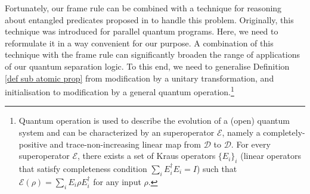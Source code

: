 \documentclass[conference,compsoc, 10pt]{IEEEtran}
\newcommand{\jh}[1]{\textit{\color{red}[JH] : #1}}
\newcommand {\cD } {{\mathcal{D}}}
\newcommand {\cE } {{\mathcal{E}}}
\begin{document}
	Fortunately, our frame rule  can be combined with a technique for reasoning about entangled predicates proposed in \cite{YZL18} to handle this problem. Originally, this technique was introduced for parallel quantum programs. Here, we need to reformulate it in a way convenient for our purpose. 
	A combination of this technique with the frame rule can significantly broaden the range of applications of our quantum separation logic. 
	To this end, we need to generalise Definition \ref{def sub atomic prop} from
  modification by a unitary transformation, and initialisation to modification
  by a general quantum operation.\footnote{Quantum operation is used to describe
    the evolution of a (open) quantum system and can be characterized by an
    superoperator $\cE$, namely a completely-positive and trace-non-increasing
    linear map from $\cD$ to $\cD$.  For every superoperator $\cE$, there exists
  a set of Kraus operators $\{E_i\}_i$ (linear operators that satisfy completeness condition $\sum_iE_i^\dag E_i = I$) such that $\cE(\rho) = \sum_i E_i\rho
E_i^\dag$ for any input $\rho$.}
\end{document}
